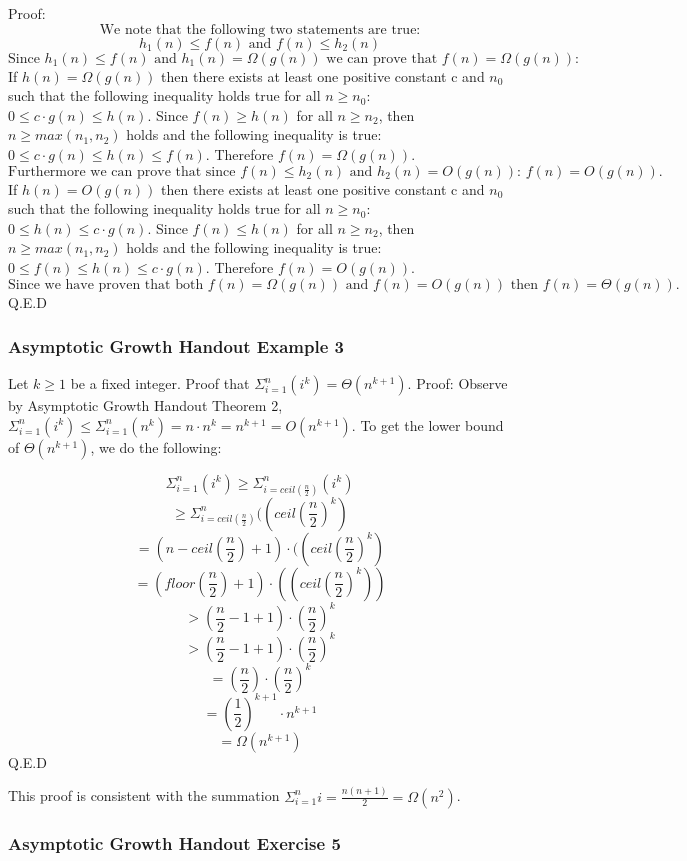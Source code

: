 \documentclass{article}
\begin{document}
Proof:
$$\text{We note that the following two statements are true:}$$
$$h_1(n) \leq f(n) \text{ and } f(n) \leq h_2(n)$$
$$\text{Since } h_1(n) \leq f(n) \text{ and } h_1(n) = \Omega(g(n)) \text{ we can prove that } f(n) = \Omega(g(n)) \text{:}$$
If $h(n) = \Omega(g(n))$ then there exists at least one positive constant c and $n_0$ such that the following inequality holds true for all $n \geq n_0$: $0 \leq c \cdot g(n) \leq h(n)$. Since $f(n) \geq h(n)$ for all $n \geq n_2$, then $n \geq max(n_1 , n_2)$ holds and the following inequality is true: $0 \leq c \cdot g(n) \leq h(n) \leq f(n) $. Therefore $f(n) = \Omega(g(n))$. 
$$\text{Furthermore we can prove that since } f(n) \leq h_2(n) \text{ and } h_2(n) = O(g(n)) \text{: } f(n) = O(g(n)).$$
If $h(n) = O(g(n))$ then there exists at least one positive constant c and $n_0$ such that the following inequality holds true for all $n \geq n_0$: $0 \leq h(n) \leq c \cdot g(n)$. Since $f(n) \leq h(n)$ for all $n \geq n_2$, then $n \geq max(n_1 , n_2)$ holds and the following inequality is true: $0 \leq f(n) \leq h(n) \leq c \cdot g(n)$. Therefore $f(n) = O(g(n))$. 
$$\text{Since we have proven that both } f(n) = \Omega(g(n)) \text{ and } f(n) = O(g(n)) \text{ then } f(n) = \Theta(g(n)).$$
Q.E.D

\subsubsection{Asymptotic Growth Handout Example 3}

Let $k \geq 1$ be a fixed integer. Proof that $\Sigma_{i=1}^{n} (i^k) = \Theta(n^{k+1})$.
Proof:
Observe by Asymptotic Growth Handout Theorem 2, $\Sigma_{i=1}^{n} (i^k) \leq \Sigma_{i=1}^{n} (n^k) = n \cdot n^k = n^{k+1} = O(n^{k+1}).$ To get the lower bound of $\Theta(n^{k+1})$, we do the following:

$$\Sigma_{i=1}^{n} (i^k) \geq \Sigma_{i=ceil(\frac{n}{2})}^{n} (i^k)$$
$$\geq \Sigma_{i=ceil(\frac{n}{2})}^{n} ((ceil(\frac{n}{2})^k)$$
$$= (n - ceil(\frac{n}{2}) + 1) \cdot ((ceil(\frac{n}{2})^k)$$
$$= (floor(\frac{n}{2}) + 1) \cdot ((ceil(\frac{n}{2})^k))$$
$$> (\frac{n}{2} -1 + 1) \cdot (\frac{n}{2})^k$$
$$> (\frac{n}{2} -1 + 1) \cdot (\frac{n}{2})^k$$
$$= (\frac{n}{2}) \cdot (\frac{n}{2})^k$$
$$= (\frac{1}{2})^{k+1} \cdot n^{k+1}$$
$$ = \Omega(n^{k+1})$$
Q.E.D

This proof is consistent with the summation $\Sigma_{i=1}^{n} i = \frac{n(n+1)}{2} = \Omega(n^2)$.

\subsubsection{Asymptotic Growth Handout Exercise 5}
\end{document}
